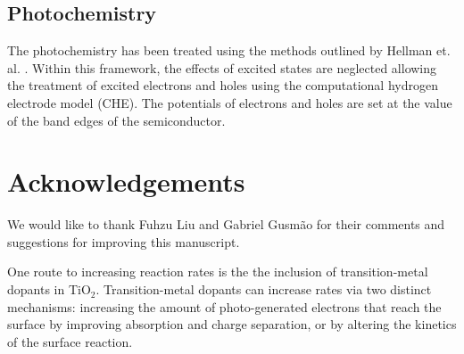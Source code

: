 \subsection{Photochemistry}
The photochemistry has been treated using the methods outlined by Hellman et. al. \cite{Hellman2017}. Within this framework, the effects of excited states are neglected allowing the treatment of excited electrons and holes using the computational hydrogen electrode model (CHE). The potentials of electrons and holes are set at the value of the band edges of the semiconductor.

\section{Acknowledgements}
We would like to thank Fuhzu Liu and Gabriel Gusm\~ao for their comments and suggestions for improving this manuscript.





One route to increasing reaction rates is the the inclusion of transition-metal dopants in TiO$_2$. Transition-metal dopants can increase rates via two distinct mechanisms: increasing the amount of photo-generated electrons that reach the surface by improving absorption and charge separation, or by altering the kinetics of the surface reaction.


